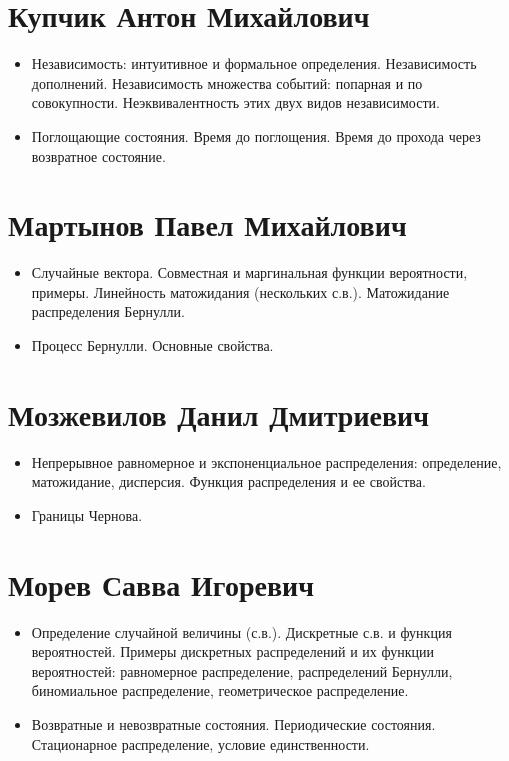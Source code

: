 \documentclass[12pt]{article}
\begin{document}
\section{Купчик Антон Михайлович}

\begin{itemize}
  \item Независимость: интуитивное и формальное определения. Независимость дополнений. Независимость множества событий: попарная и по совокупности. Неэквивалентность этих двух видов независимости.
  \item Поглощающие состояния. Время до поглощения. Время до прохода через возвратное состояние.
\end{itemize}

\section{Мартынов Павел Михайлович}

\begin{itemize}
  \item Случайные вектора. Совместная и маргинальная функции вероятности, примеры. Линейность матожидания (нескольких с.в.). Матожидание распределения Бернулли.
  \item Процесс Бернулли. Основные свойства.
\end{itemize}

\section{Мозжевилов Данил Дмитриевич}

\begin{itemize}
  \item Непрерывное равномерное и экспоненциальное распределения: определение, матожидание, дисперсия. Функция распределения и ее свойства.
  \item Границы Чернова. 
\end{itemize}

\section{Морев Савва Игоревич}

\begin{itemize}
  \item Определение случайной величины (с.в.). Дискретные с.в. и функция вероятностей. Примеры дискретных распределений и их функции вероятностей: равномерное распределение, распределений Бернулли, биномиальное распределение, геометрическое распределение.
  \item Возвратные и невозвратные состояния. Периодические состояния. Стационарное распределение, условие единственности. 
\end{itemize}
\end{document}
